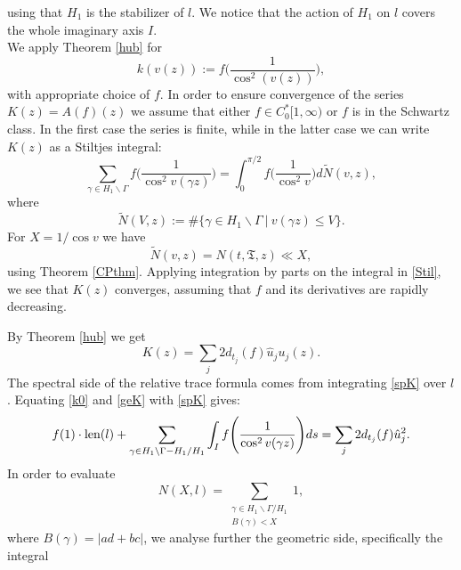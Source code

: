 \documentclass[a4paper,11pt]{amsart}
\theoremstyle{definition}
\begin{document}
using that $H_1$ is the stabilizer of $l$. We notice that the action  of $H_1$ on $l$ covers the whole imaginary axis $I$.\\
We apply Theorem \ref{hub} for $$k(v(z)):=f\Bigg(\frac{1}{\cos^2(v(z))}\Bigg),$$
with appropriate choice of $f$.
In order to ensure convergence of the series $K(z)=A(f)(z)$ we assume that either $f \in C_0^{*}[1,\infty)$ or $f$ is in the Schwartz class. In the first case the series is finite, while in the latter case we can write $K(z)$ as a Stiltjes integral:
\begin{equation}\label{Stil}
    \sum_{\gamma \in H_1\backslash \Gamma} f\Bigg(\frac{1}{\cos^2v(\gamma z)}\Bigg)= \int_0^{\pi/2}f\Bigg(\frac{1}{\cos^2v}\Bigg)d\widetilde{N}(v,z),
\end{equation}
where 
$$\widetilde{N}(V,z):=\#\big\{\gamma \in H_1 \backslash \Gamma \: \big| \: v(\gamma z) \le V \big\}.$$ For $X=1/\cos{v}$ we have 
$$ \widetilde{N}(v,z)=N(t,\mathfrak{T},z) \ll X,$$
using Theorem \ref{CPthm}. Applying integration by parts on the integral in \eqref{Stil}, we see that $K(z)$ converges, assuming that $f$ and its derivatives are rapidly decreasing.

By Theorem \ref{hub}  we get
\begin{equation}\label{spK}
 K(z)= \sum_{j}2d_{t_j}(f)\hat{u}_ju_j(z).
\end{equation}
The spectral side of the relative trace formula comes from integrating \eqref{spK} over $l$. Equating \eqref{k0} and \eqref{geK} with \eqref{spK} gives:
$$ f(1)\cdot \hbox{len}(l) + \sum_{\gamma \in H_1\backslash \Gamma - H_1 /H_1} \int_{I}  f\Bigg(\frac{1}{\cos^2v(\gamma z)}\Bigg)ds = \sum_{j}2d_{t_j}(f)\hat{u}_j^2.$$
In order to evaluate 
$$N(X,l)= \sum_{\substack{\gamma \in H_1\backslash \Gamma/H_1 \\ B(\gamma)<X}}1, $$
where $B(\gamma)=|ad+bc|$,
we analyse further the geometric side, specifically the integral 
\end{document}
